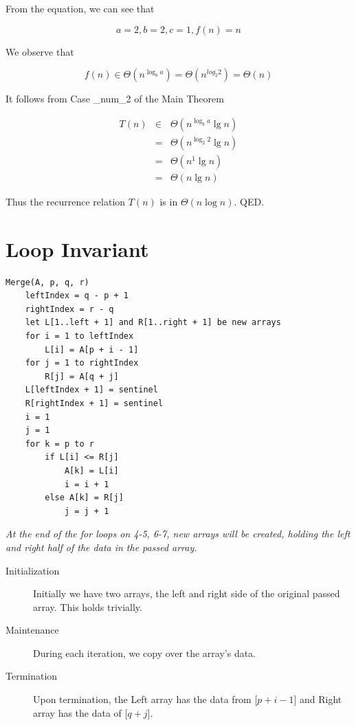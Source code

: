 \documentclass{article}
\begin{document}
From the equation, we can see that

\begin{equation}
a = 2, b = 2, c = 1, f(n) = n
\end{equation}

We observe that

\begin{equation}
f(n) \in \Theta(n^{\log _b a}) = \Theta (n ^{log _2 2}) = \Theta(n)
\end{equation}

It follows from Case \_num_2 of the Main Theorem

\begin{eqnarray}
T(n) & \in & \Theta(n^{\log _b a} \lg n) \\
& = & \Theta (n^{\log _2 2} \lg n) \\
& = & \Theta (n^1 \lg n) \\
& = & \Theta (n \lg n)
\end{eqnarray}

Thus the recurrence relation $T(n)$ is in $\Theta (n \log n)$. QED.

\section{Loop Invariant}
\begin{Verbatim}
Merge(A, p, q, r)
    leftIndex = q - p + 1
    rightIndex = r - q
    let L[1..left + 1] and R[1..right + 1] be new arrays
    for i = 1 to leftIndex
        L[i] = A[p + i - 1]
    for j = 1 to rightIndex
        R[j] = A[q + j]
    L[leftIndex + 1] = sentinel
    R[rightIndex + 1] = sentinel
    i = 1
    j = 1
    for k = p to r
        if L[i] <= R[j]
            A[k] = L[i]
            i = i + 1
        else A[k] = R[j]
            j = j + 1
\end{Verbatim}

\noindent
\textit{At the end of the for loops on 4-5, 6-7, new arrays will be created, holding the left and right half of the data in the passed array.}
\begin{description}
\item [Initialization] Initially we have two arrays, the left and right side of the original passed array. This holds trivially.
\item [Maintenance] During each iteration, we copy over the array's data.
\item [Termination] Upon termination, the Left array has the data from [$p + i - 1$] and Right array has the data of [$q + j$].
\end{description}
\end{document}
